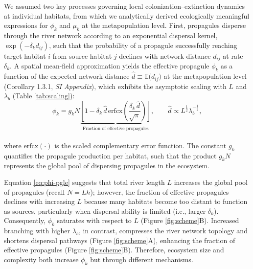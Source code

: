 \documentclass[9pt,twocolumn,twoside]{pnas-new}
\begin{document}
We assumed two key processes governing local colonization--extinction dynamics at individual habitats, from which we analytically derived ecologically meaningful expressions for $\phi_k$ and $\mu_k$ at the metapopulation level. 
First, propagules disperse through the river network according to an exponential dispersal kernel, $\exp(-\delta_k d_{ij})$, such that the probability of a propagule successfully reaching target habitat $i$ from source habitat $j$ declines with network distance $d_{ij}$ at rate $\delta_k$.
A spatial mean-field approximation \citep{ovaskainen_asymptotically_2006} yields the effective propagule $\phi_k$ as a function of the expected network distance $\hat{d} \equiv \mathbb{E}\bigl(d_{ij}\bigr)$ at the metapopulation level (Corollary 1.3.1, \textit{SI Appendix}), which exhibits the asymptotic scaling with $L$ and $\lambda_b$ (Table \ref{tab:scaling}):
\\
\begin{equation}
    \phi_k
    = 
    g_k N 
    \underbrace{
    \left[
        1 - \delta_k\,\hat{d}\,\mathrm{erfcx}
        \left(
            \frac{\delta_k\,\hat{d}}{\sqrt{\pi}}
        \right) 
    \right]
    }_{\text{Fraction of effective propagules}},
    \qquad
    \hat{d} 
    \propto 
    L^{\frac{1}{2}} \lambda_b^{-\frac{1}{2}},
\label{eq:phi-pgle}
\end{equation}
\\
where $\mathrm{erfcx}(\cdot)$ is the scaled complementary error function.
The constant $g_k$ quantifies the propagule production per habitat, such that the product $g_k N$ represents the global pool of dispersing propagules in the ecosystem.

Equation \ref{eq:phi-pgle} suggests that total river length $L$ increases the global pool of propagules (recall $N = Lh$); however, the fraction of effective propagules declines with increasing $L$ because many habitats become too distant to function as sources, particularly when dispersal ability is limited (i.e., larger $\delta_k$).
Consequently, $\phi_k$ saturates with respect to $L$ (Figure \ref{fig:scheme}B).
Increased branching with higher $\lambda_b$, in contrast, compresses the river network topology and shortens dispersal pathways (Figure \ref{fig:scheme}A), enhancing the fraction of effective propagules (Figure \ref{fig:scheme}B).
Therefore, ecosystem size and complexity both increase $\phi_k$ but through different mechanisms.
\end{document}
